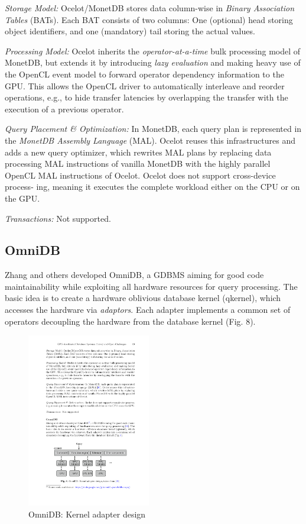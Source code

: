 \documentclass[twocolumn]{article}
\begin{document}
\noindent
\textit{Storage Model:} 
Ocelot/MonetDB stores data column-wise in \textit{Binary Association Tables} (BATs). Each BAT consists of two columns: One (optional) head storing object identifiers, and one (mandatory) tail storing the actual values.

\noindent
\textit{Processing Model:} Ocelot inherits the \textit{operator-at-a-time} bulk processing model of MonetDB, but extends it by introducing \textit{lazy evaluation} and making heavy use of the OpenCL event model to forward operator dependency information to the GPU. This allows the OpenCL driver to automatically interleave and reorder operations, e.g., to hide transfer latencies by overlapping the transfer with the execution of a previous operator.

\noindent
\textit{Query Placement \& Optimization:} 
In MonetDB, each query plan is represented in the \textit{MonetDB Assembly Language} (MAL). Ocelot reuses this infrastructures and adds a new query optimizer, which rewrites MAL plans by replacing data processing MAL instructions of vanilla MonetDB with the highly parallel OpenCL MAL instructions of Ocelot.
Ocelot does not support cross-device process- ing, meaning it executes the complete workload either on the CPU or on the GPU.

\noindent
\textit{Transactions:} Not supported.

\subsection{OmniDB}
Zhang and others developed OmniDB, a GDBMS aiming for good code maintainability while exploiting all hardware resources for query processing. 
The basic idea is to create a hardware oblivious database kernel (qkernel), which accesses the hardware via \textit{adaptors}. Each adapter implements a common set of operators decoupling the hardware from the database kernel (Fig. 8).
\begin{figure}[htb]
        \centering
        \includegraphics[width=0.48\textwidth]{omnidb.pdf}
        \caption{OmniDB: Kernel adapter design}
        \label{fig:omnidb}
\end{figure}
\end{document}
